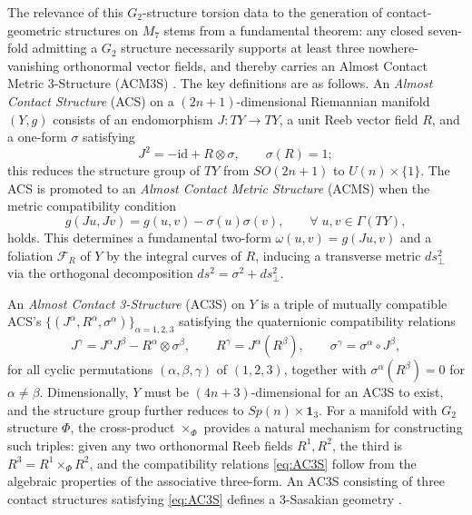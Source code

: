\documentclass[a4paper,11pt,fleqn]{article}
\theoremstyle{plain}
\theoremstyle{definition}
\begin{document}
The relevance of this $G_2$-structure torsion data to the generation of contact-geometric
structures on $M_7$ stems from a fundamental theorem: any closed seven-fold admitting a
$G_2$ structure necessarily supports at least three nowhere-vanishing orthonormal vector
fields, and thereby carries an Almost Contact Metric 3-Structure (ACM3S)
\cite{Arikan:2011zm,Arikan:2012gt,Todd:2015apo}. The key definitions are as follows. An
\emph{Almost Contact Structure} (ACS) on a $(2n+1)$-dimensional Riemannian manifold
$(Y,g)$ consists of an endomorphism $J\colon TY \to TY$, a unit Reeb vector field $R$, and
a one-form $\sigma$ satisfying \cite{Sasaki}
\begin{equation}
J^2 = -\mathrm{id} + R \otimes \sigma, \qquad \sigma(R) = 1;
\end{equation}
this reduces the structure group of $TY$ from $SO(2n+1)$ to $U(n)\times\{1\}$. The ACS is
promoted to an \emph{Almost Contact Metric Structure} (ACMS) when the metric compatibility
condition
\begin{equation}
g(Ju,Jv) = g(u,v) - \sigma(u)\sigma(v), \qquad \forall\;u,v \in \Gamma(TY),
\end{equation}
holds. This determines a fundamental two-form $\omega(u,v) = g(Ju,v)$ and a foliation
$\mathcal{F}_R$ of $Y$ by the integral curves of $R$, inducing a transverse metric
$ds^2_\perp$ via the orthogonal decomposition $ds^2 = \sigma^2 + ds^2_\perp$.

An \emph{Almost Contact 3-Structure} (AC3S) on $Y$ is a triple of mutually compatible
ACS's $\{(J^\alpha, R^\alpha, \sigma^\alpha)\}_{\alpha=1,2,3}$ satisfying the quaternionic
compatibility relations \cite{Kuo-AC3S}
\begin{equation}
J^\gamma = J^\alpha J^\beta - R^\alpha \otimes \sigma^\beta,
\qquad
R^\gamma = J^\alpha(R^\beta),
\qquad
\sigma^\gamma = \sigma^\alpha \circ J^\beta,
\label{eq:AC3S}
\end{equation}
for all cyclic permutations $(\alpha,\beta,\gamma)$ of $(1,2,3)$, together with
$\sigma^\alpha(R^\beta) = 0$ for $\alpha \neq \beta$. Dimensionally, $Y$ must be
$(4n+3)$-dimensional for an AC3S to exist, and the structure group further reduces to
$Sp(n)\times\mathbf{1}_3$. For a manifold with $G_2$ structure $\Phi$, the cross-product
$\times_\Phi$ provides a natural mechanism for constructing such triples: given any two
orthonormal Reeb fields $R^1, R^2$, the third is $R^3 = R^1 \times_\Phi R^2$, and the
compatibility relations \eqref{eq:AC3S} follow from the algebraic properties of the
associative three-form. An AC3S consisting of three contact structures satisfying
\eqref{eq:AC3S} defines a 3-Sasakian geometry \cite{3-Sasakian-geometry}.
\end{document}
